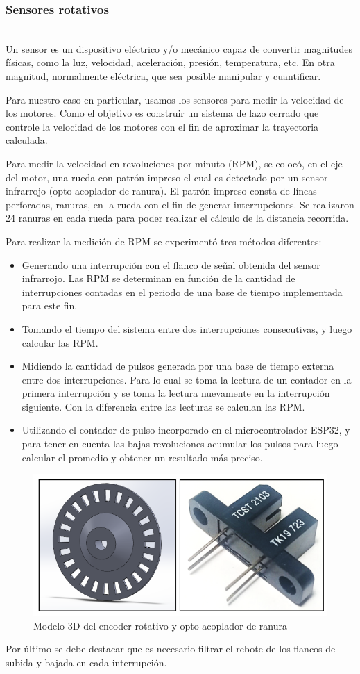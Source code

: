 \subsubsection{Sensores rotativos} \mbox{} \vspace{10pt} \\
Un sensor es un dispositivo eléctrico y/o mecánico capaz de convertir magnitudes físicas, como la luz, velocidad, aceleración, presión, temperatura, etc. En otra magnitud, normalmente eléctrica, que sea posible manipular y cuantificar.

Para nuestro caso en particular, usamos los sensores para medir la velocidad de los motores. Como el objetivo es construir un sistema de lazo cerrado que controle la velocidad de los motores con el fin de aproximar la trayectoria calculada.

Para medir la velocidad en revoluciones por minuto (RPM), se colocó, en el eje del motor, una rueda con patrón impreso el cual es detectado por un sensor infrarrojo (opto acoplador de ranura). El patrón impreso consta de líneas perforadas, ranuras, en la rueda con el fin de generar interrupciones. Se realizaron 24 ranuras en cada rueda para poder realizar el cálculo de la distancia recorrida.

Para realizar la medición de RPM se experimentó tres métodos diferentes:

\begin{itemize}
   \item Generando una interrupción con el flanco de señal obtenida del sensor infrarrojo. Las RPM se determinan en función de la cantidad de interrupciones contadas en el periodo de una base de tiempo implementada para este fin.
   \item Tomando el tiempo del sistema entre dos interrupciones consecutivas, y luego calcular las RPM.
   \item Midiendo la cantidad de pulsos generada por una base de tiempo externa entre dos interrupciones. Para lo cual se toma la lectura de un contador en la primera interrupción y se toma la lectura nuevamente en la interrupción siguiente. Con la diferencia entre las lecturas se calculan las RPM.
   \item Utilizando el contador de pulso incorporado en el microcontrolador ESP32, y para tener en cuenta las bajas revoluciones acumular los pulsos para luego calcular el promedio y obtener un resultado más preciso.
\end{itemize}

\begin{figure}[H]
  \centering
  \includegraphics[width=0.7\linewidth]{images/encoder.png}
  \caption{Modelo 3D del encoder rotativo y opto acoplador de ranura}
  \label{fig:encoder}
\end{figure}

Por último se debe destacar que es necesario filtrar el rebote de los flancos de subida y bajada en cada interrupción.